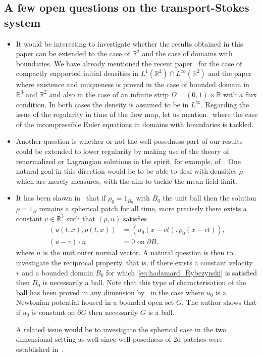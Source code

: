 \documentclass[10pt]{amsart}
\theoremstyle{definition}\newtheorem{defi}[theo]{Definition}\newtheorem{rema}[theo]{Remark}\newtheorem{exam}[theo]{Example}\newtheorem{exem}[theo]{Example}\newtheorem{nota}[theo]{Notation}
\newcommand{\R}{\mathbb{R}}
\begin{document}
\subsection{A few open questions on the transport-Stokes system}


\begin{itemize}
\item It would be interesting to investigate whether the results obtained in this paper can be extended to the case of $\R^2$ and the case of domains with boundaries. We have already mentioned the recent paper~\cite{GrayerII} for the case of compactly supported initial densities in $L^1(\R^2)\cap L^\infty(\R^2)$ and the paper~\cite{Leblond} where existence and uniqueness is proved in the case of bounded domain in $\R^3$ and $\R^2$ and also in the case of an infinite strip $\Omega= (0,1)\times \R$ with a flux condition. In both cases the density is assumed to be in $ L^{\infty}$. Regarding the issue of the regularity in time of the flow map, let us mention~\cite{ogfstt,GS,Kato,Sueur} where the case of the incompressible Euler equations in domains with boundaries is tackled.

\item Another question is whether or not the well-posedness part of our results could be extended to lower regularity by making use of the theory of renormalized or Lagrangian solutions in the spirit, for example, of~\cite{CCS,Lions}. One natural goal in this direction would be to be able to deal with densities $\rho$ which are merely measures, with the aim to tackle the mean field limit.
\item It has been shown in~\cite{Mecherbet2} that if $\rho_0=1_{B_0}$ with $B_0$ the unit ball then the solution $\rho=1_{B}$ remains a spherical patch for all time, more precisely there exists a constant $v\in \R^3$ such that $(\rho,u)$ satisfies
\begin{equation}\label{eq:hadamard_Rybczynski}
\begin{split}
(u(t,x),\rho(t,x))&=(u_0(x-vt),\rho_0(x-vt)),\\
(u-v)\cdot n& = 0 \text{ on } \partial B,
\end{split}
\end{equation}
where $n$ is the unit outer normal vector. A natural question is then to investigate the reciprocal property, that is, if there exists a constant velocity $v$ and a bounded domain $B_0$ for which~\eqref{eq:hadamard_Rybczynski} is satisfied then $B_0$ is necessarily a ball. Note that this type of characterisation of the ball has been proved in any dimension by~\cite[Theorem~1.1]{Fraenkel} in the case where $u_0$ is a Newtonian potential housed in a bounded open set $G$. The author shows that if $u_0$ is constant on $\partial G$ then necessarily $G$ is a ball.

A related issue would be to investigate the spherical case in the two dimensional setting as well since well posedness of $2$d patches were established in~\cite{GrayerII}.
\end{itemize}
\end{document}
